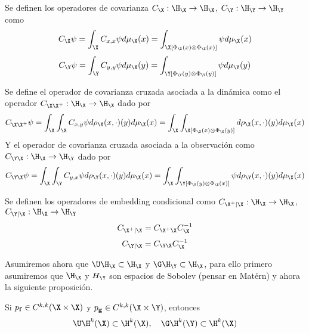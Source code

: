 \begin{defn}
    Se definen los operadores de covarianza $C_\X : \H_\X \to \H_\X$, $C_\Y : \H_\Y \to \H_\Y$ como
        \begin{equation*}
        C_\X \psi = \int_\X C_{x, x} \psi d \mu_\X (x) = \int_\X [\Phi_\X (x) \otimes \Phi_\X (x)] \psi d \mu_\X (x)
    \end{equation*}
     \begin{equation*}
    	C_\Y \psi = \int_\Y C_{y,y} \psi d \mu_\X (y) =  \int_\Y [\Phi_\Y (y) \otimes \Phi_\Y (y)] \psi d \mu_\Y (y)
    \end{equation*}
\end{defn}
\begin{defn}
    Se define el operador de covarianza cruzada asociada a la dinámica como el operador $C_{\X \X^+} : \H_\X \to \H_\X$ dado por 
    \begin{equation*}
        C_{\X \X^+} \psi = \int_\X \int_\X C_{x, y} \psi d\rho_\X (x, \cdot)(y) d \mu_\X (x)= \int_\X \int_\X [\Phi_\X (x) \otimes \Phi_\X (y)] d\rho_\X (x, \cdot)(y) d \mu_\X (x) 
    \end{equation*}
    Y el operador de covarianza cruzada asociada a la observación como $C_{\Y \X} : \H_\X \to \H_\Y$ dado por
    \begin{equation*}
        C_{\Y \X} \psi = \int_\X \int_\Y C_{y,x} \psi d\rho_\Y (x, \cdot) (y) d \mu_\X (x) = \int_\X \int_\Y [\Phi_\Y (y) \otimes \Phi_\X (x)] \psi d\rho_\Y (x, \cdot) (y) d \mu_\X (x)
    \end{equation*}
\end{defn}
\begin{defn}   
	Se definen los operadores de embedding condicional como $C_{\X^+ | \X} : \H_\X \to \H_\X$, $C_{\Y | \X} : \H_\X \to \H_\Y$
	\begin{equation*}
		C_{\X^+ | \X} = C_{\X^+ \X} C_{\X}^{-1}
	\end{equation*}
	\begin{equation*}
		C_{\Y | \X} = C_{\Y \X} C_{\X}^{-1}
	\end{equation*}
\end{defn}
Asumiremos ahora que $\U \H_\X \subset \H_\X$ y $\G \H_\Y \subset \H_\X$, para ello primero asumiremos que $\H_\X$ y $H_\Y$ son espacios de Sobolev (pensar en Matérn) y ahora la siguiente proposición.
\begin{prop}
	Si $p_\mathbf{f} \in C^{k,k} (\X \times \X)$ y $p_\mathbf{g} \in C^{k,k} (\X \times \Y)$, entonces 
	\begin{equation*}
		\U \H^k (\X) \subset \H^k (\X), \quad \G \H^k (\Y) \subset \H^k (\X)
	\end{equation*}
\end{prop}
